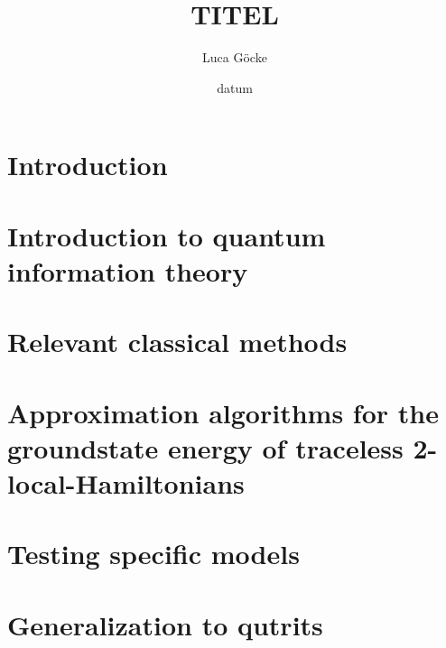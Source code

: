 \documentclass[pstricks,siunitx,theorem,british]{tumphthesis}
\title{TITEL}
\author{Luca Göcke}
\date{datum}
\begin{document}
\frontmatter
\maketitle
\tableofcontents
\mainmatter
\chapter{Introduction}

\chapter{Introduction to quantum information theory}

\chapter{Relevant classical methods}

\chapter{Approximation algorithms for the groundstate energy of traceless 2-local-Hamiltonians}

\chapter{Testing specific models}

\chapter{Generalization to qutrits}

\backmatter
\printbibliography
\end{document}
